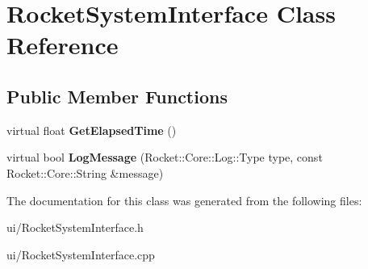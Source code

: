 \hypertarget{classRocketSystemInterface}{\section{\-Rocket\-System\-Interface \-Class \-Reference}
\label{classRocketSystemInterface}
}
\subsection*{\-Public \-Member \-Functions}
\begin{DoxyCompactItemize}
\item 
\hypertarget{classRocketSystemInterface_a311eba7c534ea9295e9fba8a63622eac}{virtual float {\bfseries \-Get\-Elapsed\-Time} ()}\label{classRocketSystemInterface_a311eba7c534ea9295e9fba8a63622eac}

\item 
\hypertarget{classRocketSystemInterface_ac0a25c175310c0fc7bf033a2dc6db664}{virtual bool {\bfseries \-Log\-Message} (\-Rocket\-::\-Core\-::\-Log\-::\-Type type, const \-Rocket\-::\-Core\-::\-String \&message)}\label{classRocketSystemInterface_ac0a25c175310c0fc7bf033a2dc6db664}

\end{DoxyCompactItemize}


\-The documentation for this class was generated from the following files\-:\begin{DoxyCompactItemize}
\item 
ui/\-Rocket\-System\-Interface.\-h\item 
ui/\-Rocket\-System\-Interface.\-cpp\end{DoxyCompactItemize}
